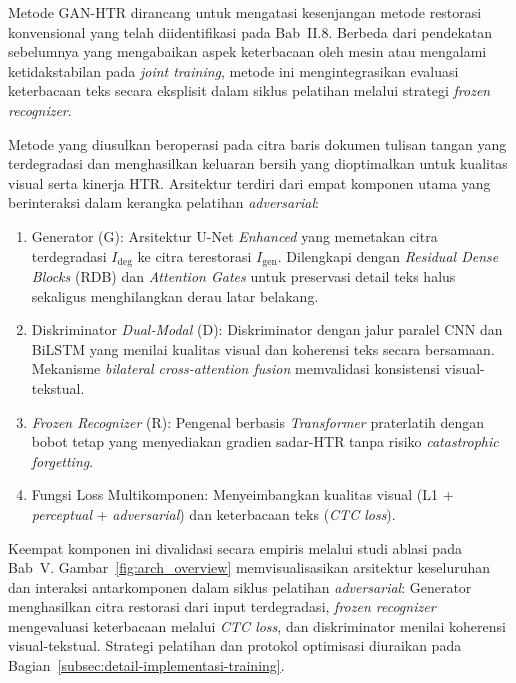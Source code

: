 Metode GAN-HTR dirancang untuk mengatasi kesenjangan metode restorasi konvensional yang telah diidentifikasi pada Bab~II.8. Berbeda dari pendekatan sebelumnya yang mengabaikan aspek keterbacaan oleh mesin atau mengalami ketidakstabilan pada \textit{joint training}, metode ini mengintegrasikan evaluasi keterbacaan teks secara eksplisit dalam siklus pelatihan melalui strategi \textit{frozen recognizer}.

Metode yang diusulkan beroperasi pada citra baris dokumen tulisan tangan yang terdegradasi dan menghasilkan keluaran bersih yang dioptimalkan untuk kualitas visual serta kinerja HTR. Arsitektur terdiri dari empat komponen utama yang berinteraksi dalam kerangka pelatihan \textit{adversarial}:

\begin{enumerate}[leftmargin=1.5em, labelsep=0.5em, itemindent=0pt, noitemsep, topsep=0pt]
  \item Generator (G): Arsitektur U-Net \textit{Enhanced} yang memetakan citra terdegradasi $I_{\text{deg}}$ ke citra terestorasi $I_{\text{gen}}$. Dilengkapi dengan \textit{Residual Dense Blocks} (RDB) dan \textit{Attention Gates} untuk preservasi detail teks halus sekaligus menghilangkan derau latar belakang.
  \item Diskriminator \textit{Dual-Modal} (D): Diskriminator dengan jalur paralel CNN dan BiLSTM yang menilai kualitas visual dan koherensi teks secara bersamaan. Mekanisme \textit{bilateral cross-attention fusion} memvalidasi konsistensi visual-tekstual.
  \item \textit{Frozen Recognizer} (R): Pengenal berbasis \textit{Transformer} praterlatih dengan bobot tetap yang menyediakan gradien sadar-HTR tanpa risiko \textit{catastrophic forgetting}.
  \item Fungsi Loss Multikomponen: Menyeimbangkan kualitas visual (L1 + \textit{perceptual} + \textit{adversarial}) dan keterbacaan teks (\textit{CTC loss}).
\end{enumerate}

\noindent Keempat komponen ini divalidasi secara empiris melalui studi ablasi pada Bab~V. Gambar~\ref{fig:arch_overview} memvisualisasikan arsitektur keseluruhan dan interaksi antarkomponen dalam siklus pelatihan \textit{adversarial}: Generator menghasilkan citra restorasi dari input terdegradasi, \textit{frozen recognizer} mengevaluasi keterbacaan melalui \textit{CTC loss}, dan diskriminator menilai koherensi visual-tekstual. Strategi pelatihan dan protokol optimisasi diuraikan pada Bagian~\ref{subsec:detail-implementasi-training}.

